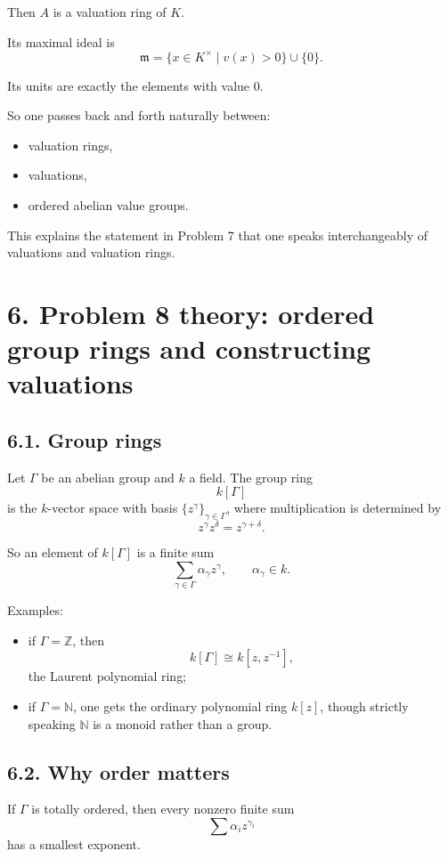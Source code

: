 \documentclass[12pt,a4paper]{article}
\theoremstyle{plain}
\theoremstyle{definition}      %
\begin{document}
Then \(A\) is a valuation ring of \(K\).

Its maximal ideal is
\[
\mathfrak m=\{x\in K^\times\mid v(x)>0\}\cup\{0\}.
\]

Its units are exactly the elements with value \(0\).

So one passes back and forth naturally between:
\begin{itemize}
	\item valuation rings,
	\item valuations,
	\item ordered abelian value groups.
\end{itemize}

This explains the statement in Problem 7 that one speaks interchangeably of valuations and valuation rings.

\bigskip

\section*{6. Problem 8 theory: ordered group rings and constructing valuations}

\subsection*{6.1. Group rings}

Let \(\Gamma\) be an abelian group and \(k\) a field. The group ring
\[
k[\Gamma]
\]
is the \(k\)-vector space with basis \(\{z^\gamma\}_{\gamma\in\Gamma}\), where multiplication is determined by
\[
z^\gamma z^\delta = z^{\gamma+\delta}.
\]

So an element of \(k[\Gamma]\) is a finite sum
\[
\sum_{\gamma\in\Gamma}\alpha_\gamma z^\gamma,
\qquad
\alpha_\gamma\in k.
\]

Examples:
\begin{itemize}
	\item if \(\Gamma=\mathbb{Z}\), then
	\[
	k[\Gamma]\cong k[z,z^{-1}],
	\]
	the Laurent polynomial ring;
	\item if \(\Gamma=\mathbb{N}\), one gets the ordinary polynomial ring \(k[z]\), though strictly speaking \(\mathbb{N}\) is a monoid rather than a group.
\end{itemize}

\subsection*{6.2. Why order matters}

If \(\Gamma\) is totally ordered, then every nonzero finite sum
\[
\sum \alpha_i z^{\gamma_i}
\]
has a smallest exponent.
\end{document}
